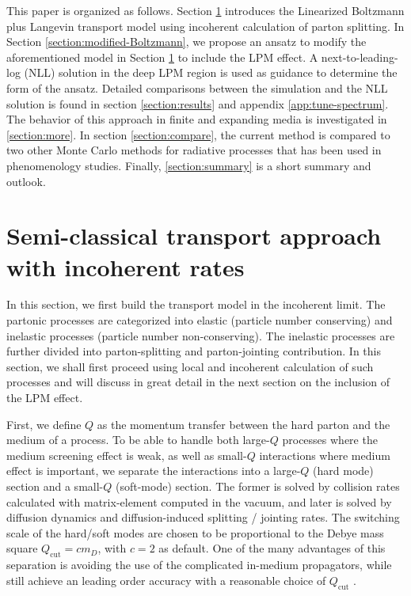 \documentclass[aps, prc, reprint, amsmath, groupedaddress, nofootinbib]{revtex4-1}
\begin{document}
This paper is organized as follows. Section \ref{section:Boltzmann} introduces the Linearized Boltzmann plus Langevin transport model using incoherent calculation of parton splitting.
In Section \ref{section:modified-Boltzmann}, we propose an ansatz to modify the aforementioned model in Section \ref{section:Boltzmann} to include the LPM effect.
A next-to-leading-log (NLL) solution in the deep LPM region is used as guidance to determine the form of the ansatz.
Detailed comparisons between the simulation and the NLL solution is found in section \ref{section:results} and appendix \ref{app:tune-spectrum}.
The behavior of this approach in finite and expanding media is investigated in \ref{section:more}.
In section \ref{section:compare}, the current method is compared to two other Monte Carlo methods for radiative processes that has been used in phenomenology studies.
Finally, \ref{section:summary} is a short summary and outlook.



\section{Semi-classical transport approach with incoherent rates}\label{section:Boltzmann}
In this section, we first build the transport model in the incoherent limit. 
The partonic processes are categorized into elastic (particle number conserving) and inelastic processes (particle number non-conserving). 
The inelastic processes are further divided into parton-splitting and parton-jointing contribution. 
In this section, we shall first proceed using local and incoherent calculation of such processes and will discuss in great detail in the next section on  the inclusion of the LPM effect.

First, we define $Q$ as the momentum transfer between the hard parton and the medium of a process.
To be able to handle both large-$Q$ processes where the medium screening effect is weak, as well as small-$Q$ interactions where medium effect is important,
we separate the interactions into a large-$Q$ (hard mode) section and a small-$Q$ (soft-mode) section.
The former is solved by collision rates calculated with matrix-element computed in the vacuum, and later is solved by diffusion dynamics and diffusion-induced splitting / jointing rates.
The switching scale of the hard/soft modes are chosen to be proportional to the Debye mass square $Q_{\textrm{cut}} = c m_D$, with $c=2$ as default.
One of the many advantages of this separation is avoiding the use of the complicated in-medium propagators, while still achieve an leading order accuracy with a reasonable choice of $Q_{\textrm{cut}}$ \cite{Ghiglieri:2015ala}.
\end{document}
